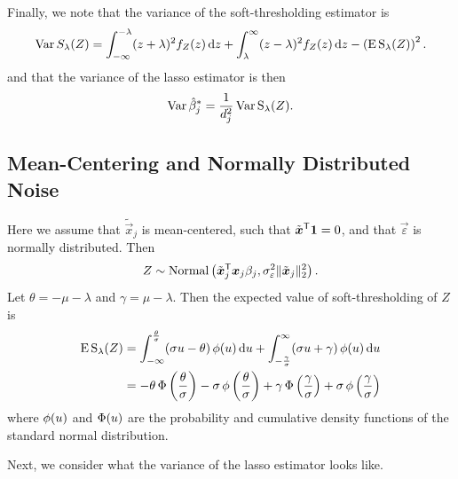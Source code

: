 Finally, we note that the variance of the soft-thresholding estimator is
\begin{equation}
  \label{eq:st-variance}
  \operatorname{Var} {S_\lambda(Z)} = \int_{-\infty}^{-\lambda}(z + \lambda)^2f_Z(z) \mathop{}\!\mathrm{d} z + \int_{\lambda}^\infty (z - \lambda)^2 f_Z(z) \mathop{}\!\mathrm{d} z - \left(\operatorname{E} \operatorname{S}_\lambda(Z)\right)^2.
\end{equation}
and that the variance of the lasso estimator is then
\begin{equation}
  \label{eq:betahat-variance}
  \operatorname{Var} \hat\beta_j^* = \frac{1}{d_j^2} \operatorname{Var} \operatorname{S}_\lambda(Z).
\end{equation}

\subsection{Mean-Centering and Normally Distributed Noise}

Here we assume that \(\tilde{\vec{x}}_j\) is mean-centered, such that \(\tilde{\boldsymbol{x}}^{\mathsf{T}} \boldsymbol{1} = 0\), and that \(\vec{\varepsilon}\) is normally distributed. Then
\[
  Z \sim \operatorname{Normal}\left(\tilde{\boldsymbol{x}}_j^{\mathsf{T}}\boldsymbol{x}_j \beta_j, \sigma_\varepsilon^2 \lVert \tilde{\boldsymbol{x}}_j\rVert_2^2 \right).
\]
Let \(\theta = -\mu -\lambda \) and \(\gamma = \mu - \lambda\). Then the expected value of soft-thresholding of \(Z\) is
\begin{align}
  \operatorname{E} \operatorname{S}_\lambda(Z) & = \int_{-\infty}^\frac{\theta}{\sigma} (\sigma u - \theta) \operatorname{\phi}(u) \mathop{}\!\mathrm{d} u + \int_{-\frac{\gamma}{\sigma}}^\infty (\sigma u + \gamma) \operatorname{\phi}(u) \mathop{}\!\mathrm{d} u                                               \nonumber                      \\
                    & = -\theta \operatorname{\Phi}\left(\frac{\theta}{\sigma}\right) - \sigma \operatorname{\phi}\left(\frac{\theta}{\sigma}\right) + \gamma \operatorname{\Phi}\left(\frac{\gamma}{\sigma}\right) + \sigma \operatorname{\phi}\left(\frac{\gamma}{\sigma}\right) \label{eq:mean-centered-eval}
\end{align}
where \(\operatorname{\phi}(u)\) and \(\operatorname{\Phi}(u)\) are the probability and cumulative density functions of the standard normal distribution.

Next, we consider what the variance of the lasso estimator looks like.

